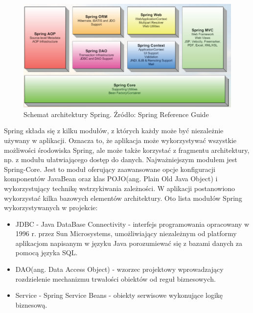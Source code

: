 \vspace*{0.1cm}
\begin{figure}[!ht]
\centering
\includegraphics[scale=0.31]{images/spring-modules}
\caption[Rysunek przedstawiający model architektury Spring]{Schemat architektury Spring. Źródło: Spring Reference Guide\cite{spring_reference}}
\label{img:rysunek_spring}
\end{figure}

Spring składa się z kilku modułów, z których każdy może być niezależnie używany w aplikacji. Oznacza to, że aplikacja może wykorzystywać wszystkie możliwości środowiska Spring, ale może także korzystać z fragmentu architektury, np. z modułu ułatwiającego dostęp do danych. Najważniejszym modułem jest Spring-Core. Jest to moduł oferujący zaawansowane opcje konfiguracji komponentów JavaBean oraz klas POJO(ang. Plain Old Java Object) i wykorzystujący technikę wstrzykiwania zależności.
W aplikacji postanowiono wykorzystać kilka bazowych elementów architektury. Oto lista modułów Spring wykorzystywanych w projekcie:
\begin{itemize}
 \item JDBC - Java DataBase Connectivity - interfejs programowania opracowany w 1996 r. przez Sun Microsystems, umożliwiający niezależnym od platformy aplikacjom napisanym w języku Java porozumiewać się z bazami danych za pomocą języka SQL.
 \item DAO(ang. Data Access Object) - wzorzec projektowy wprowadzający rozdzielenie mechanizmu trwałości obiektów od reguł biznesowych.
 \item Service - Spring Service Beans - obiekty serwisowe wykonujące logikę biznesową.
\end{itemize}

